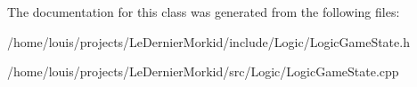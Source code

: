 The documentation for this class was generated from the following files\+:\begin{DoxyCompactItemize}
\item 
/home/louis/projects/\+Le\+Dernier\+Morkid/include/\+Logic/Logic\+Game\+State.\+h\item 
/home/louis/projects/\+Le\+Dernier\+Morkid/src/\+Logic/Logic\+Game\+State.\+cpp\end{DoxyCompactItemize}
